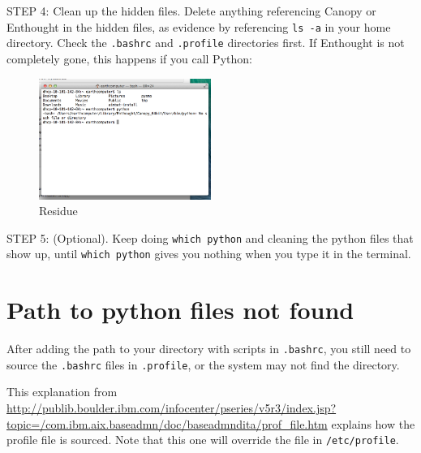 \documentclass[letterpaper,10pt]{article}
\begin{document}
STEP 4: Clean up the hidden files. Delete anything referencing Canopy or Enthought in the hidden files, as evidence by referencing \verb"ls -a" in your home directory. Check the \verb".bashrc" and \verb".profile" directories first. If Enthought is not completely gone, this happens if you call Python:

\begin{figure}[h!]
  \centering
  \includegraphics[width=0.5\textwidth]{images/residue}
  \caption{Residue}
  \label{fig:residue}
\end{figure}

STEP 5: (Optional). Keep doing \texttt{which python} and cleaning the python files that show up, until \texttt{which python} gives you nothing when you type it in the terminal. 




\section{Path to python files not found}


After adding the path to your directory with scripts in \verb".bashrc", you still need to source the \verb".bashrc" files in \verb".profile", or the system may not find the directory. 

This explanation from \url{http://publib.boulder.ibm.com/infocenter/pseries/v5r3/index.jsp?topic=/com.ibm.aix.baseadmn/doc/baseadmndita/prof_file.htm} explains how the profile file is sourced. Note that this one will override the file in \texttt{/etc/profile}.
\end{document}
